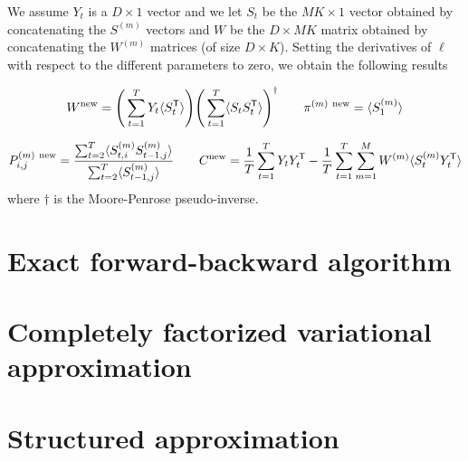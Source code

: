 \documentclass{article}
\begin{document}
We assume $Y_t$ is a $D \times 1$ vector and we let $S_t$ be the $MK \times 1$ vector obtained by concatenating the $S^{(m)}$ vectors and $W$ be the $D \times MK$ matrix obtained by concatenating the $W^{(m)}$ matrices (of size $D \times K$). Setting the derivatives of $\ell$ with respect to the different parameters to zero, we obtain the following results

\[ W^\textnormal{new} = \Bigg( \sum_{t=1}^T Y_t \langle S_{t}^\mathsf{T} \rangle \Bigg) \Bigg( \sum_{t=1}^T \langle S_{t} S_{t}^\mathsf{T} \rangle \Bigg)^\dagger \qquad \pi^{(m) \ \textnormal{new}} = \langle S_{1}^{(m)}  \rangle\]

\[ P_{i,j}^{(m) \ \textnormal{new}} = \frac{\sum_{t=2}^T \langle S_{t,i}^{(m)} S_{t-1,j}^{(m)}  \rangle}{\sum_{t=2}^T \langle S_{t-1,j}^{(m)}  \rangle} \qquad C^{\textnormal{new}} = \frac{1}{T} \sum_{t=1}^T Y_t Y_t^\mathsf{T} - \frac{1}{T} \sum_{t=1}^T \sum_{m=1}^M W^{(m)} \langle S_t^{(m)} Y_t^\mathsf{T} \rangle \]
where $\dagger$ is the Moore-Penrose pseudo-inverse.

\section{Exact forward-backward algorithm}

\section{Completely factorized variational approximation}

\section{Structured approximation}
\end{document}
